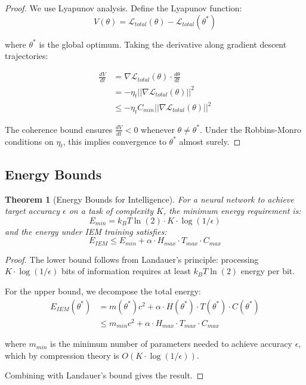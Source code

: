 \documentclass[12pt]{article}
\newtheorem{theorem}{Theorem}
\begin{document}
\begin{proof}
We use Lyapunov analysis. Define the Lyapunov function:
\begin{equation}
V(\theta) = \mathcal{L}_{total}(\theta) - \mathcal{L}_{total}(\theta^*)
\end{equation}

where $\theta^*$ is the global optimum. Taking the derivative along gradient descent trajectories:

\begin{align}
\frac{dV}{dt} &= \nabla \mathcal{L}_{total}(\theta) \cdot \frac{d\theta}{dt} \\
&= -\eta_t ||\nabla \mathcal{L}_{total}(\theta)||^2 \\
&\leq -\eta_t C_{min} ||\nabla \mathcal{L}_{total}(\theta)||^2
\end{align}

The coherence bound ensures $\frac{dV}{dt} < 0$ whenever $\theta \neq \theta^*$. Under the Robbins-Monro conditions on $\eta_t$, this implies convergence to $\theta^*$ almost surely.
\end{proof}

\subsection{Energy Bounds}

\begin{theorem}[Energy Bounds for Intelligence]
\label{thm:energy_bounds}
For a neural network to achieve target accuracy $\epsilon$ on a task of complexity $K$, the minimum energy requirement is:
\begin{equation}
E_{min} = k_B T \ln(2) \cdot K \cdot \log(1/\epsilon)
\end{equation}
and the energy under IEM training satisfies:
\begin{equation}
E_{IEM} \leq E_{min} + \alpha \cdot H_{max} \cdot T_{max} \cdot C_{max}
\end{equation}
\end{theorem}

\begin{proof}
The lower bound follows from Landauer's principle: processing $K \cdot \log(1/\epsilon)$ bits of information requires at least $k_B T \ln(2)$ energy per bit.

For the upper bound, we decompose the total energy:
\begin{align}
E_{IEM}(\theta^*) &= m(\theta^*)c^2 + \alpha \cdot H(\theta^*) \cdot T(\theta^*) \cdot C(\theta^*) \\
&\leq m_{min}c^2 + \alpha \cdot H_{max} \cdot T_{max} \cdot C_{max}
\end{align}

where $m_{min}$ is the minimum number of parameters needed to achieve accuracy $\epsilon$, which by compression theory is $O(K \cdot \log(1/\epsilon))$.

Combining with Landauer's bound gives the result.
\end{proof}
\end{document}

